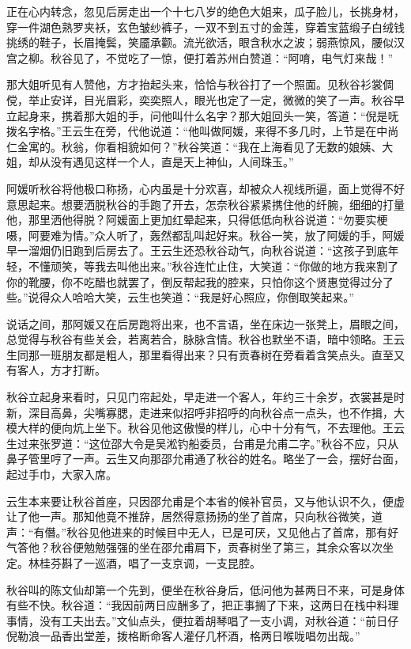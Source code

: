 \documentclass[12pt,UTF8]{ctexbook}
\begin{document}
{{{正在心内转念，忽见后房走出一个十七八岁的绝色大姐来，瓜子脸儿，长挑身材，穿一件湖色熟罗夹袄，玄色皱纱裤子，一双不到五寸的金莲，穿着宝蓝缎子白绒钱挑绣的鞋子，长眉掩鬓，笑靥承颧。流光欲活，眼含秋水之波；弱燕惊风，腰似汉宫之柳。秋谷见了，不觉吃了一惊，便打着苏州白赞道：“阿唷，电气灯来哉！”

那大姐听见有人赞他，方才抬起头来，恰恰与秋谷打了一个照面。见秋谷衫裳倜傥，举止安详，目光眉彩，奕奕照人，眼光也定了一定，微微的笑了一声。秋谷早立起身来，携着那大姐的手，问他叫什么名字？那大姐回头一笑，答道：“倪是呒拨名字格。”王云生在旁，代他说道：“他叫做阿媛，来得不多几时，上节是在中尚仁金寓的。秋翁，你看相貌如何？”秋谷笑道：“我在上海看见了无数的娘姨、大姐，却从没有遇见这样一个人，直是天上神仙，人间珠玉。”

阿媛听秋谷将他极口称扬，心内虽是十分欢喜，却被众人视线所逼，面上觉得不好意思起来。想要洒脱秋谷的手跑了开去，怎奈秋谷紧紧携住他的纤腕，细细的打量他，那里洒他得脱？阿媛面上更加红晕起来，只得低低向秋谷说道：“勿要实梗嗫，阿要难为情。”众人听了，轰然都乱叫起好来。秋谷一笑，放了阿媛的手，阿媛早一溜烟仍旧跑到后房去了。王云生还恐秋谷动气，向秋谷说道：“这孩子到底年轻，不懂顽笑，等我去叫他出来。”秋谷连忙止住，大笑道：“你做的地方我来割了你的靴腰，你不吃醋也就罢了，倒反帮起我的腔来，只怕你这个贤惠觉得过分了些。”说得众人哈哈大笑，云生也笑道：“我是好心照应，你倒取笑起来。”

说话之间，那阿媛又在后房跑将出来，也不言语，坐在床边一张凳上，眉眼之间，总觉得与秋谷有些关会，若离若合，脉脉含情。秋谷也默坐不语，暗中领略。王云生同那一班朋友都是粗人，那里看得出来？只有贡春树在旁看着含笑点头。直至又有客人，方才打断。

秋谷立起身来看时，只见门帘起处，早走进一个客人，年约三十余岁，衣裳甚是时新，深目高鼻，尖嘴寡腮，走进来似招呼非招呼的向秋谷点一点头，也不作揖，大模大样的便向炕上坐下。秋谷见他这傲慢的样儿，心中十分有气，不去理他。王云生过来张罗道：“这位邵大令是吴淞钓船委员，台甫是允甫二字。”秋谷不应，只从鼻子管里哼了一声。云生又向那邵允甫通了秋谷的姓名。略坐了一会，摆好台面，起过手巾，大家入席。

云生本来要让秋谷首座，只因邵允甫是个本省的候补官员，又与他认识不久，便虚让了他一声。那知他竟不推辞，居然得意扬扬的坐了首席，只向秋谷微笑，道声：“有僭。”秋谷见他进来的时候目中无人，已是可厌，又见他占了首席，那有好气答他？秋谷便勉勉强强的坐在邵允甫肩下，贡春树坐了第三，其余众客以次坐定。林桂芬斟了一巡酒，唱了一支京调，一支昆腔。

秋谷叫的陈文仙却第一个先到，便坐在秋谷身后，低问他为甚两日不来，可是身体有些不快。秋谷道：“我因前两日应酬多了，把正事搁了下来，这两日在栈中料理事情，没有工夫出去。”文仙点头，便拉着胡琴唱了一支小调，对秋谷道：“前日仔倪勒浪一品香出堂差，拨格断命客人灌仔几杯酒，格两日喉咙唱勿出哉。”

}}}
\end{document}
